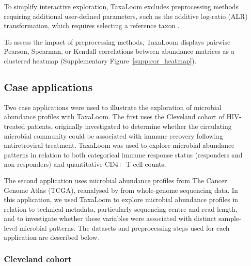 \documentclass[pdflatex,sn-vancouver-num]{sn-jnl}%
\theoremstyle{thmstyleone}%
\theoremstyle{thmstyletwo}%
\theoremstyle{thmstylethree}%
\begin{document}
To simplify interactive exploration, TaxaLoom excludes preprocessing methods requiring additional user-defined parameters, such as the additive log-ratio (ALR) transformation, which requires selecting a reference taxon \citep{aitchison_statistical_1982}.

To assess the impact of preprocessing methods, TaxaLoom displays pairwise Pearson, Spearman, or Kendall correlations between abundance matrices as a clustered heatmap (Supplementary Figure~\ref{supp:cor_heatmap}).

\subsection{Case applications}

Two case applications were used to illustrate the exploration of microbial abundance profiles with TaxaLoom. The first uses the Cleveland cohort \citep{lederman_immunologic_2011, nganou-makamdop_translocated_2021,colajanni_benchmarking_2026} of HIV-treated patients, originally investigated to determine whether the circulating microbial community could be associated with immune recovery following antiretroviral treatment. TaxaLoom was used to explore microbial abundance patterns in relation to both categorical immune response status (responders and non-responders) and quantitative CD4+ T-cell counts.


The second application uses microbial abundance profiles from The Cancer Genome Atlas (TCGA), reanalysed by \citet{ge_comprehensive_2025} from whole-genome sequencing data. In this application, we used TaxaLoom to explore microbial abundance profiles in relation to technical metadata, particularly sequencing centre and read length, and to investigate whether these variables were associated with distinct sample-level microbial patterns. The datasets and preprocessing steps used for each application are described below.

\subsubsection*{Cleveland cohort}
\end{document}
